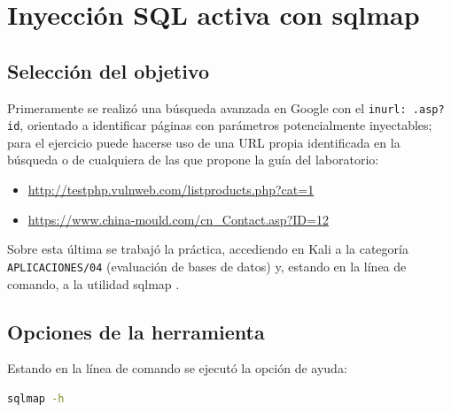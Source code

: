 \section{Inyección SQL activa con sqlmap}

\subsection{Selección del objetivo}

Primeramente se realizó una búsqueda avanzada en Google con el  \texttt{inurl: .asp?id}, orientado a identificar páginas con parámetros potencialmente inyectables; para el ejercicio puede hacerse uso de una URL propia identificada en la búsqueda o de cualquiera de las que propone la guía del laboratorio:

\begin{itemize}
  \item \url{http://testphp.vulnweb.com/listproducts.php?cat=1}
  \item \url{https://www.china-mould.com/cn_Contact.asp?ID=12}
\end{itemize}

Sobre esta última se trabajó la práctica, accediendo en Kali a la categoría \texttt{APLICACIONES/04} (evaluación de bases de datos) y, estando en la línea de comando, a la utilidad sqlmap \cite{sqlmap-docs}.

\subsection{Opciones de la herramienta}

Estando en la línea de comando se ejecutó la opción de ayuda:

\begin{lstlisting}[language=bash]
sqlmap -h
\end{lstlisting}

